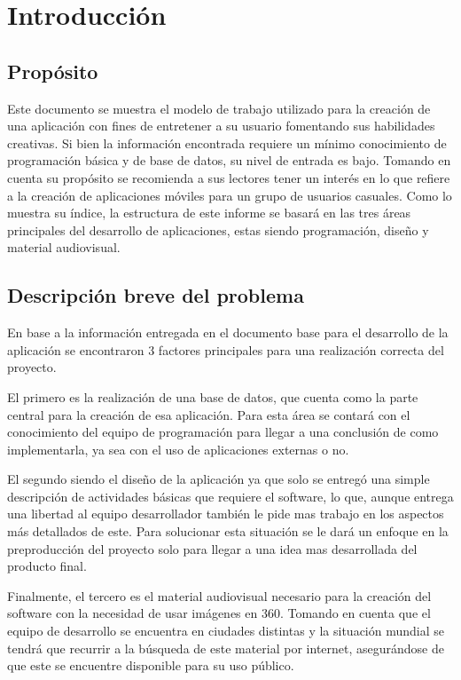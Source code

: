 \section{Introducción}
\subsection{Propósito}
Este documento se muestra el modelo de trabajo utilizado para la creación de una aplicación con fines de entretener a su usuario fomentando sus habilidades creativas. Si bien la información encontrada requiere un mínimo conocimiento de programación básica y de base de datos, su nivel de entrada es bajo. Tomando en cuenta su propósito se recomienda a sus lectores tener un interés en lo que refiere a la creación de aplicaciones móviles para un grupo de usuarios casuales. Como lo muestra su índice, la estructura de este informe se basará en las tres áreas principales del desarrollo de aplicaciones, estas siendo programación, diseño y material audiovisual.
\subsection{Descripción breve del problema}
En base a la información entregada en el documento base para el desarrollo de la aplicación se encontraron 3 factores principales para una realización correcta del proyecto. 

El primero es la realización de una base de datos, que cuenta como la parte central para la creación de esa aplicación. Para esta área se contará con el conocimiento del equipo de programación para llegar a una conclusión de como implementarla, ya sea con el uso de aplicaciones externas o no.

 El segundo siendo el diseño de la aplicación ya que solo se entregó una simple descripción de actividades básicas que requiere el software, lo que, aunque entrega una libertad al equipo desarrollador también le pide mas trabajo en los aspectos más detallados de este. Para solucionar esta situación se le dará un enfoque en la preproducción del proyecto solo para llegar a una idea mas desarrollada del producto final.
 
Finalmente, el tercero es el material audiovisual necesario para la creación del software con la necesidad de usar imágenes en 360. Tomando en cuenta que el equipo de desarrollo se encuentra en ciudades distintas y la situación mundial se tendrá que recurrir a la búsqueda de este material por internet, asegurándose de que este se encuentre disponible para su uso público.